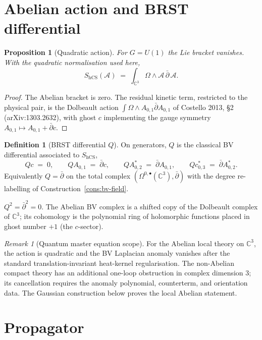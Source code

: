 \documentclass[11pt]{amsart}
\providecommand{\C}{\mathbb{C}}
\providecommand{\dbar}{\bar{\partial}}
\theoremstyle{plain}
\newtheorem{proposition}[theorem]{Proposition}
\theoremstyle{definition}
\newtheorem{definition}[theorem]{Definition}
\theoremstyle{remark}
\newtheorem{remark}[theorem]{Remark}
\begin{document}
\section{Abelian action and BRST differential}

\begin{proposition}[Quadratic action]
\label{prop:quadratic-action}
For $G = U(1)$ the Lie bracket vanishes. With the quadratic
normalisation used here,
\[
S_{\mathrm{hCS}}(\mathcal{A}) \;=\; \int_{\C^3} \Omega \wedge \mathcal{A} \,\dbar\, \mathcal{A}.
\]
\end{proposition}

\begin{proof}
The Abelian bracket is zero. The residual kinetic term, restricted to
the physical pair, is the Dolbeault action
$\int \Omega \wedge A_{0,1} \dbar A_{0,1}$ of Costello 2013, §2
(arXiv:1303.2632), with ghost $c$ implementing the gauge symmetry
$A_{0,1} \mapsto A_{0,1} + \dbar c$.
\end{proof}

\begin{definition}[BRST differential $Q$]
\label{def:Q-BRST}
On generators, $Q$ is the classical BV differential associated to
$S_{\mathrm{hCS}}$,
\[
Q c \;=\; 0, \qquad
Q A_{0,1} \;=\; \dbar c, \qquad
Q A^{\ast}_{0,2} \;=\; \dbar A_{0,1}, \qquad
Q c^{\ast}_{0,3} \;=\; \dbar A^{\ast}_{0,2}.
\]
Equivalently $Q = \dbar$ on the total complex
$(\Omega^{0,\bullet}(\C^3), \dbar)$ with the degree re-labelling of
Construction~\ref{cons:bv-field}.
\end{definition}

$Q^2 = \dbar^2 = 0$. The Abelian BV complex is a shifted copy of the
Dolbeault complex of $\C^3$; its cohomology is the polynomial ring of
holomorphic functions placed in ghost number $+1$ (the $c$-sector).

\begin{remark}[Quantum master equation scope]
For the Abelian local theory on $\C^3$, the action is quadratic and the
BV Laplacian anomaly vanishes after the standard translation-invariant
heat-kernel regularisation. The non-Abelian compact theory has an
additional one-loop obstruction in complex dimension $3$; its
cancellation requires the anomaly polynomial, counterterm, and
orientation data. The Gaussian construction below proves the local
Abelian statement.
\end{remark}

\section{Propagator}
\end{document}
